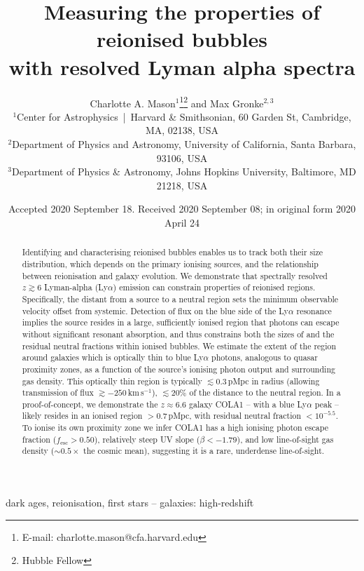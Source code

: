 \documentclass[fleqn,usenatbib]{mnras}
\title[Properties of reionised bubbles]{Measuring the properties of reionised bubbles\\with resolved Lyman alpha spectra}
\author[Mason and Gronke]{Charlotte A. Mason$^{1}$\thanks{E-mail: charlotte.mason@cfa.harvard.edu}\thanks{Hubble Fellow}
and Max Gronke$^{2,3}$\href{Hfootnote.2}{\samethanks}
\\
$^{1}$Center for Astrophysics \,|\, Harvard \& Smithsonian, 60 Garden St, Cambridge, MA, 02138, USA\\
$^{2}$Department of Physics and Astronomy, University of California, Santa Barbara, 93106, USA\\
$^{3}$Department of Physics \& Astronomy, Johns Hopkins University, Baltimore, MD 21218, USA
}
\date{Accepted 2020 September 18. Received 2020 September 08; in original form 2020 April 24
}
\begin{document}
\label{firstpage}
\pagerange{\pageref{firstpage}--\pageref{lastpage}}
\maketitle

\begin{abstract}
%
Identifying and characterising reionised bubbles enables us to track both their size distribution, which depends on the primary ionising sources, and the relationship between reionisation and galaxy evolution.
%
We demonstrate that spectrally resolved $z\gtrsim6$ Lyman-alpha (Ly$\alpha$) emission can constrain properties of reionised regions.
%
Specifically, the distant from a source to a neutral region sets the minimum observable \lya velocity offset from systemic. Detection of flux on the blue side of the Ly$\alpha$ resonance implies the source resides in a large, sufficiently ionised region that photons can escape without significant resonant absorption, and thus constrains both the sizes of and the residual neutral fractions within ionised bubbles. 
%
We estimate the extent of the region around galaxies which is optically thin to blue Ly$\alpha$ photons, analogous to quasar proximity zones, as a function of the source's ionising photon output and surrounding gas density.
This optically thin region is typically $\lesssim 0.3$\,pMpc in radius (allowing transmission of flux $\gtrsim -250$\,km\,s$^{-1}$), $\lesssim 20$\% of the distance to the neutral region.
%
In a proof-of-concept, we demonstrate the $z\approx6.6$ galaxy COLA1 -- with a blue Ly$\alpha$ peak -- likely resides in an ionised region $>0.7$\,pMpc, with residual neutral fraction $<10^{-5.5}$. To ionise its own proximity zone we infer COLA1 has a high ionising photon escape fraction ($f_{\mathrm{esc}}>0.50$), relatively steep UV slope ($\beta < -1.79$), and low line-of-sight gas density ($\sim0.5\times$ the cosmic mean), suggesting it is a rare, underdense line-of-sight.
%
\end{abstract}

\begin{keywords}
dark ages, reionisation, first stars -- galaxies: high-redshift
\end{keywords}
\end{document}
